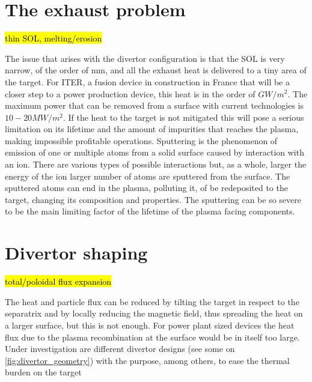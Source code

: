 \section{The exhaust problem}
\hl{thin SOL, melting/erosion}

The issue that arises with the divertor configuration is that the SOL is  very narrow, of the order of mm, and all the exhaust heat is delivered to a tiny area of the target. For ITER, a fusion device in construction in France that will be a closer step to a power production device, this heat is in the order of $GW/m^2$. The maximum power that can be removed from a surface with current technologies is $10-20MW/m^2$. \cite{Lipschultz2018} If the heat to the target is not mitigated this will pose a serious limitation on its lifetime and the amount of impurities that reaches the plasma, making impossible profitable operations. 
Sputtering is the phenomenon of emission of one or multiple atoms from a solid surface caused by interaction with an ion. There are various types of possible interactions but, as a whole, larger the energy of the ion larger number of atoms are sputtered from the surface. The sputtered atoms can end in the plasma, polluting it, of be redeposited to the target, changing its composition and properties. The sputtering can be so severe to be the main limiting factor of the lifetime of the plasma facing components.

\section{Divertor shaping}
\hl{total/poloidal flux expansion}

The heat and particle flux can be reduced by tilting the target in respect to the separatrix and by locally reducing the magnetic field, thus spreading the heat on a larger surface, but this is not enough. For power plant sized devices the heat flux due to the plasma recombination at the surface would be in itself too large.
Under investigation are different divertor designs (see some on \autoref{fig:divertor_geometry}) with the purpose, among others, to ease the thermal burden on the target

